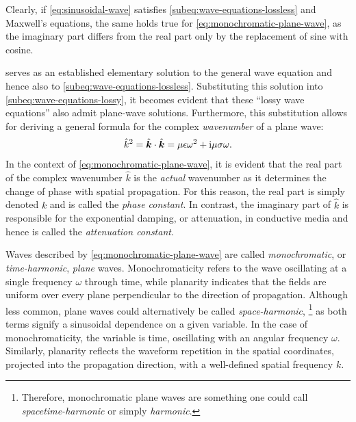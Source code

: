 \documentclass[14pt,a4paper]{ntust_report}
\begin{document}
\begin{remark}
    Clearly, if \cref{eq:sinusoidal-wave} satisfies \cref{subeq:wave-equations-lossless} and Maxwell's equations, the same holds true for \cref{eq:monochromatic-plane-wave}, as the imaginary part differs from the real part only by the replacement of sine with cosine.
\end{remark}

 serves as an established elementary solution to the general wave equation and hence also to \cref{subeq:wave-equations-lossless}. Substituting this solution into \cref{subeq:wave-equations-lossy}, it becomes evident that these \enquote{lossy wave equations} also admit plane-wave solutions. Furthermore, this substitution allows for deriving a general formula for the complex \emph{wavenumber} of a plane wave:
\begin{align}
    \label{eq:wave-number}
    \hat k^2 = \hat{\boldsymbol k} \cdot \hat{\boldsymbol k} = \mu\epsilon\omega^2 + \mathrm i\mu\sigma\omega.
\end{align}
In the context of \cref{eq:monochromatic-plane-wave}, it is evident that the real part of the complex wavenumber $\hat k$ is the \emph{actual} wavenumber as it determines the change of phase with spatial propagation. For this reason, the real part is simply denoted $k$ and is called the \emph{phase constant}. In contrast, the imaginary part of $\hat k$ is responsible for the exponential damping, or attenuation, in conductive media and hence is called the \emph{attenuation constant}.

Waves described by \cref{eq:monochromatic-plane-wave} are called \emph{monochromatic}, or \emph{time-harmonic}, \emph{plane}
waves. Monochromaticity refers to the wave oscillating at a single frequency $\omega$ through time, while planarity indicates that the fields are uniform over every plane perpendicular to the direction of propagation. Although less common, plane waves could alternatively be called \emph{space-harmonic},%
    \footnote{Therefore, monochromatic plane waves are something one could call \emph{spacetime-harmonic} or simply \emph{harmonic}.}
as both terms signify a sinusoidal dependence on a given variable. In the case of monochromaticity, the variable is time, oscillating with an angular frequency $\omega$. Similarly, planarity reflects the waveform repetition in the spatial coordinates, projected into the propagation direction, with a well-defined spatial frequency $k$.
\end{document}
